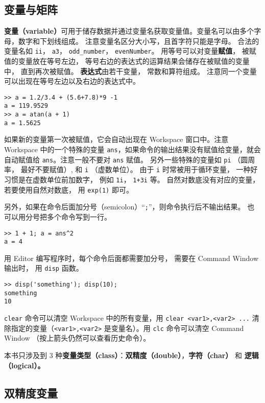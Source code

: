 

\subsection{变量与矩阵}
\textbf{变量（variable）}可用于储存数据并通过变量名获取变量值。变量名可以由多个字母，数字和下划线组成。 注意变量名区分大小写，且首字符只能是字母。 合法的变量名如 \verb|ii|， \verb|a3|， \verb|odd_number|， \verb|evenNumber|。 用等号可以对变量\textbf{赋值}， 被赋值的变量放在等号左边， 等号右边的表达式的运算结果会储存在被赋值的变量中， 直到再次被赋值。 \textbf{表达式}由若干变量， 常数和算符组成。 注意同一个变量可以出现在等号左边以及右边的表达式中。
\begin{lstlisting}[language=matlabC]
>> a = 1.2/3.4 + (5.6+7.8)*9 -1
a = 119.9529
>> a = atan(a + 1)
a = 1.5625
\end{lstlisting}
如果新的变量第一次被赋值，它会自动出现在 Workspace 窗口中。注意 Workspace 中的一个特殊的变量 \verb|ans|，如果命令的输出结果没有赋值给变量，就会自动赋值给 \verb|ans|。注意一般不要对 \verb|ans| 赋值。 另外一些特殊的变量如 \verb|pi| （圆周率， 最好不要赋值）, 和 \verb|i| （虚数单位）。 由于 \verb|i| 时常被用于循环变量， 一种好习惯是在虚数单位前加数字， 例如 \verb|1i|， \verb|1+3i| 等。 自然对数底没有对应的变量， 若要使用自然对数底， 用 \verb|exp(1)| 即可。

另外，如果在命令后面加分号（semicolon）“\verb|;|”，则命令执行后不输出结果。 也可以用分号把多个命令写到一行。
\begin{lstlisting}[language=matlabC]
>> 1 + 1; a = ans^2
a = 4
\end{lstlisting}
用 Editor 编写程序时，每个命令后面都需要加分号， 需要在 Command Window 输出时， 用 \verb|disp| 函数。
\begin{lstlisting}[language=matlabC]
>> disp('something'); disp(10);
something
10
\end{lstlisting}

\verb|clear| 命令可以清空 Workspace 中的所有变量，用 \verb|clear <var1>,<var2> ...| 清除指定的变量（\verb|<var1>,<var2>| 是变量名）。用 \verb|clc| 命令可以清空 Command Window （按上箭头仍然可以查看历史命令）。

本书只涉及到 3 种\textbf{变量类型（class）}：\textbf{双精度（double）}，\textbf{字符（char）} 和 \textbf{逻辑（logical）。}

\subsection{双精度变量}

